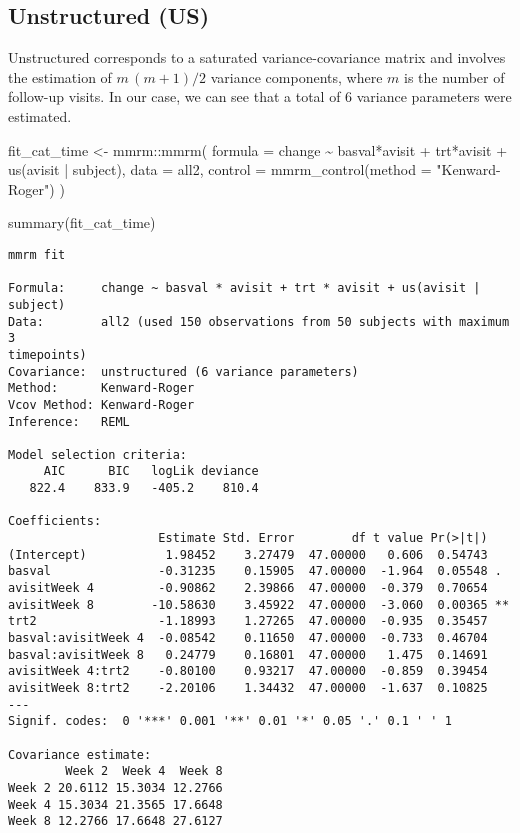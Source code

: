 \documentclass[
  letterpaper,
  DIV=11,
  numbers=noendperiod]{scrreprt}
\newenvironment{Shaded}{\begin{snugshade}}{\end{snugshade}}
\newcommand{\AttributeTok}[1]{\textcolor[rgb]{0.40,0.45,0.13}{#1}}
\newcommand{\FunctionTok}[1]{\textcolor[rgb]{0.28,0.35,0.67}{#1}}
\newcommand{\NormalTok}[1]{\textcolor[rgb]{0.00,0.23,0.31}{#1}}
\newcommand{\OtherTok}[1]{\textcolor[rgb]{0.00,0.23,0.31}{#1}}
\newcommand{\SpecialCharTok}[1]{\textcolor[rgb]{0.37,0.37,0.37}{#1}}
\newcommand{\StringTok}[1]{\textcolor[rgb]{0.13,0.47,0.30}{#1}}
\begin{document}
\hypertarget{unstructured-us}{%
\subsection{Unstructured (US)}\label{unstructured-us}}

Unstructured corresponds to a saturated variance-covariance matrix and
involves the estimation of \(m\,(m+1)/2\) variance components, where
\(m\) is the number of follow-up visits. In our case, we can see that a
total of 6 variance parameters were estimated.

\begin{Shaded}
\begin{Highlighting}[]
\NormalTok{fit\_cat\_time }\OtherTok{\textless{}{-}}\NormalTok{ mmrm}\SpecialCharTok{::}\FunctionTok{mmrm}\NormalTok{(}
  \AttributeTok{formula =}\NormalTok{ change }\SpecialCharTok{\textasciitilde{}}\NormalTok{ basval}\SpecialCharTok{*}\NormalTok{avisit }\SpecialCharTok{+}\NormalTok{ trt}\SpecialCharTok{*}\NormalTok{avisit }\SpecialCharTok{+} \FunctionTok{us}\NormalTok{(avisit }\SpecialCharTok{|}\NormalTok{ subject),}
  \AttributeTok{data =}\NormalTok{ all2,}
  \AttributeTok{control =} \FunctionTok{mmrm\_control}\NormalTok{(}\AttributeTok{method =} \StringTok{"Kenward{-}Roger"}\NormalTok{)}
\NormalTok{)}

\FunctionTok{summary}\NormalTok{(fit\_cat\_time)}
\end{Highlighting}
\end{Shaded}

\begin{verbatim}
mmrm fit

Formula:     change ~ basval * avisit + trt * avisit + us(avisit | subject)
Data:        all2 (used 150 observations from 50 subjects with maximum 3 
timepoints)
Covariance:  unstructured (6 variance parameters)
Method:      Kenward-Roger
Vcov Method: Kenward-Roger
Inference:   REML

Model selection criteria:
     AIC      BIC   logLik deviance 
   822.4    833.9   -405.2    810.4 

Coefficients: 
                     Estimate Std. Error        df t value Pr(>|t|)   
(Intercept)           1.98452    3.27479  47.00000   0.606  0.54743   
basval               -0.31235    0.15905  47.00000  -1.964  0.05548 . 
avisitWeek 4         -0.90862    2.39866  47.00000  -0.379  0.70654   
avisitWeek 8        -10.58630    3.45922  47.00000  -3.060  0.00365 **
trt2                 -1.18993    1.27265  47.00000  -0.935  0.35457   
basval:avisitWeek 4  -0.08542    0.11650  47.00000  -0.733  0.46704   
basval:avisitWeek 8   0.24779    0.16801  47.00000   1.475  0.14691   
avisitWeek 4:trt2    -0.80100    0.93217  47.00000  -0.859  0.39454   
avisitWeek 8:trt2    -2.20106    1.34432  47.00000  -1.637  0.10825   
---
Signif. codes:  0 '***' 0.001 '**' 0.01 '*' 0.05 '.' 0.1 ' ' 1

Covariance estimate:
        Week 2  Week 4  Week 8
Week 2 20.6112 15.3034 12.2766
Week 4 15.3034 21.3565 17.6648
Week 8 12.2766 17.6648 27.6127
\end{verbatim}
\end{document}
